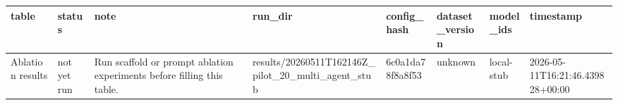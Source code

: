 \begin{tabular}{llllllll}
\toprule
table & status & note & run\_dir & config\_hash & dataset\_version & model\_ids & timestamp \\
\midrule
Ablation results & not yet run & Run scaffold or prompt ablation experiments before filling this table. & results/20260511T162146Z\_pilot\_20\_multi\_agent\_stub & 6c0a1da78f8a8f53 & unknown & local-stub & 2026-05-11T16:21:46.439828+00:00 \\
\bottomrule
\end{tabular}
